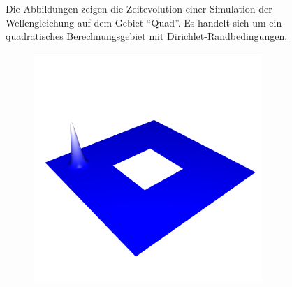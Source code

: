 \documentclass[crop=false,10pt,ngerman]{standalone}
\begin{document}
\begin{figure}[h]
\begin{subfigure}[b]{0.24\textwidth}
          \caption{}
        \end{subfigure}
        \caption[Wellensimulation auf einem quadratischen Gebiet]{%
          Die Abbildungen zeigen die Zeitevolution einer Simulation der Wellengleichung auf dem Gebiet \enquote{Quad}.
          Es handelt sich um ein quadratisches Berechnungsgebiet mit Dirichlet-Randbedingungen.
        }
        \label{fig:quad-wave}
      \end{figure}

      \begin{figure}[h]
        \center
        \begin{subfigure}[b]{0.24\textwidth}
          \center
          \includegraphics[trim={0.9cm 1.8cm 0.5cm 5cm},clip,width=0.95\textwidth]{images/ring_wave_0.png}
          \caption{}
        \end{subfigure}
        \begin{subfigure}[b]{0.24\textwidth}
          \center

\end{subfigure}
\end{figure}
\end{document}
